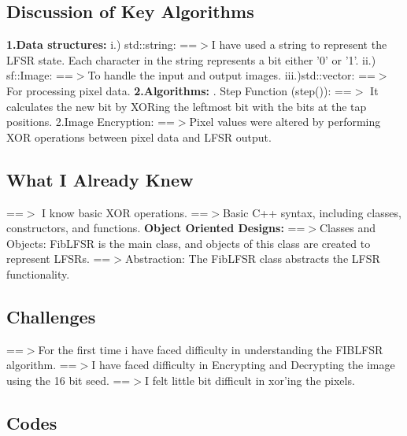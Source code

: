 \documentclass[12pt]{article}
\begin{document}
\subsection{Discussion of Key Algorithms}
\textbf{1.Data structures:}
\newline
i.) std::string:
\newline
==$>$I have used a string to represent the LFSR state. Each character in the string represents a bit either '0' or '1'.
\newline
ii.) sf::Image:
\newline 
==$>$To handle the input and output images.
\newline
iii.)std::vector: 
\newline
==$>$For processing pixel data.
\newline
\textbf{2.Algorithms:}
. Step Function (step()):
\newline
==$>$ It calculates the new bit by XORing the leftmost bit with the bits at the tap positions.
\newline
2.Image Encryption: 
\newline
==$>$Pixel values were altered by performing XOR operations between pixel data and LFSR output.
\subsection{What I Already Knew}
==$>$ I know basic XOR operations.
\newline
==$>$Basic C++ syntax, including classes, constructors, and functions.
\newline
\textbf{Object Oriented Designs:}
\newline
==$>$Classes and Objects: FibLFSR is the main class, and objects of this class are created to represent LFSRs.
\newline
==$>$Abstraction: The FibLFSR class abstracts the LFSR functionality.
\subsection{Challenges}
==$>$For the first time i have faced difficulty in understanding the FIBLFSR algorithm.
\newline
==$>$I have faced difficulty in Encrypting and Decrypting the image using the 16 bit seed.
\newline
==$>$I felt little bit difficult in xor'ing the pixels.


\subsection{Codes}
\end{document}
